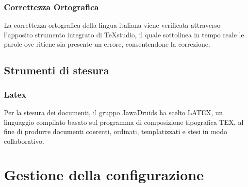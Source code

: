 \subsubsection{Correttezza Ortografica}
La correttezza ortografica della lingua italiana viene verificata attraverso l'apposito strumento integrato di \TeX studio, il quale sottolinea in tempo reale le parole ove ritiene sia presente un errore, consentendone la correzione.
\subsection{Strumenti di stesura}
\subsubsection{Latex}
Per la stesura dei documenti, il gruppo JawaDruids ha scelto LATEX, un linguaggio compilato basato sul programma di composizione tipografica TEX, al fine di produrre documenti coerenti, ordinati, templatizzati e stesi in modo collaborativo. 
\section{Gestione della configurazione}
